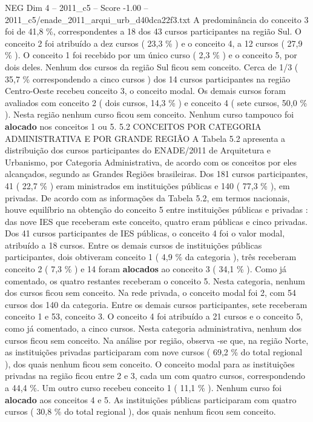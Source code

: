 \begin{textsample}{NEG Dim 4 – 2011\_c5 – Score -1.00 – 2011\_c5/enade\_2011\_arqui\_urb\_d40dca22f3.txt}
A predominância do conceito 3 foi de 41,8 \%, correspondentes a 18 dos 43 cursos participantes na região Sul.
O conceito 2 foi atribuído a dez cursos ( 23,3 \% ) e o conceito 4, a 12 cursos ( 27,9 \% ).
O conceito 1 foi recebido por um único curso ( 2,3 \% ) e o conceito 5, por dois deles.
Nenhum dos cursos da região Sul ficou sem conceito.
Cerca de 1/3 ( 35,7 \% correspondendo a cinco cursos ) dos 14 cursos participantes na região Centro-Oeste recebeu conceito 3, o conceito modal.
Os demais cursos foram avaliados com conceito 2 ( dois cursos, 14,3 \% ) e conceito 4 ( sete cursos, 50,0 \% ).
Nesta região nenhum curso ficou sem conceito.
Nenhum curso tampouco foi \textbf{alocado} nos conceitos 1 ou 5. 5.2 CONCEITOS POR CATEGORIA ADMINISTRATIVA E POR GRANDE REGIÃO A Tabela 5.2 apresenta a distribuição dos cursos participantes do ENADE/2011 de Arquitetura e Urbanismo, por Categoria Administrativa, de acordo com os conceitos por eles alcançados, segundo as Grandes Regiões brasileiras.
Dos 181 cursos participantes, 41 ( 22,7 \% ) eram ministrados em instituições públicas e 140 ( 77,3 \% ), em privadas.
De acordo com as informações da Tabela 5.2, em termos nacionais, houve equilíbrio na obtenção do conceito 5 entre instituições públicas e privadas : das nove IES que receberam este conceito, quatro eram públicas e cinco privadas.
Dos 41 cursos participantes de IES públicas, o conceito 4 foi o valor modal, atribuído a 18 cursos.
Entre os demais cursos de instituições públicas participantes, dois obtiveram conceito 1 ( 4,9 \% da categoria ), três receberam conceito 2 ( 7,3 \% ) e 14 foram \textbf{alocados} ao conceito 3 ( 34,1 \% ).
Como já comentado, os quatro restantes receberam o conceito 5.
Nesta categoria, nenhum dos cursos ficou sem conceito.
Na rede privada, o conceito modal foi 2, com 54 cursos dos 140 da categoria.
Entre os demais cursos participantes, sete receberam conceito 1 e 53, conceito 3.
O conceito 4 foi atribuído a 21 cursos e o conceito 5, como já comentado, a cinco cursos.
Nesta categoria administrativa, nenhum dos cursos ficou sem conceito.
Na análise por região, observa -se que, na região Norte, as instituições privadas participaram com nove cursos ( 69,2 \% do total regional ), dos quais nenhum ficou sem conceito.
O conceito modal para as instituições privadas na região ficou entre 2 e 3, cada um com quatro cursos, correspondendo a 44,4 \%.
Um outro curso recebeu conceito 1 ( 11,1 \% ).
Nenhum curso foi \textbf{alocado} aos conceitos 4 e 5.
As instituições públicas participaram com quatro cursos ( 30,8 \% do total regional ), dos quais nenhum ficou sem conceito.

\end{textsample}
